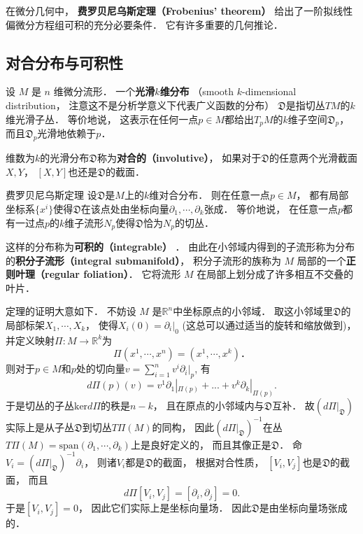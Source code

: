 

在微分几何中， \textbf{费罗贝尼乌斯定理（Frobenius' theorem）} 给出了一阶拟线性偏微分方程组可积的充分必要条件． 它有许多重要的几何推论．

\subsection{对合分布与可积性}
设 $M$ 是 $n$ 维微分流形． 一个\textbf{光滑$k$维分布} （smooth $k$-dimensional distribution， 注意这不是分析学意义下代表广义函数的分布） $\mathfrak{D}$是指切丛$TM$的$k$维光滑子丛． 等价地说， 这表示在任何一点$p\in M$都给出$T_pM$的$k$维子空间$\mathfrak{D}_p$， 而且$\mathfrak{D}_p$光滑地依赖于$p$．

维数为$k$的光滑分布$\mathfrak{D}$称为\textbf{对合的（involutive）}， 如果对于$\mathfrak{D}$的任意两个光滑截面$X,Y$， $[X,Y]$也还是$\mathfrak{D}$的截面． 

\begin{theorem}{费罗贝尼乌斯定理}
设$\mathfrak{D}$是$M$上的$k$维对合分布． 则在任意一点$p\in M$， 都有局部坐标系$\{x^i\}$使得$\mathfrak{D}$在该点处由坐标向量$\partial_1,\cdots ,\partial_k$张成． 等价地说， 在任意一点$p$都有一过点$p$的$k$维子流形$N_p$使得$\mathfrak{D}$恰为$N_p$的切丛．
\end{theorem}
这样的分布称为\textbf{可积的（integrable）} ． 由此在小邻域内得到的子流形称为分布的\textbf{积分子流形（integral submanifold）}， 积分子流形的族称为 $M$ 局部的一个\textbf{正则叶理（regular foliation）}． 它将流形 $M$ 在局部上划分成了许多相互不交叠的叶片．

定理的证明大意如下． 不妨设 $M$ 是$\mathbb{R}^n$中坐标原点的小邻域． 取这小邻域里$\mathfrak{D}$的局部标架$X_1,\cdots ,X_k$， 使得$X_i(0)=\partial_i|_0$ (这总可以通过适当的旋转和缩放做到)， 并定义映射$\Pi: M\to \mathbb{R}^k$为
$$
\Pi(x^1,\cdots ,x^n)=(x^1,\cdots ,x^k)．
$$
则对于$p\in M$和$p$处的切向量$v=\sum_{i=1}^nv^i\partial_i|_p$, 有
$$
d\Pi(p)(v)=v^1\partial_1|_{\Pi(p)}+...+v^k\partial_k|_{\Pi(p)}.
$$
于是切丛的子丛$\text{ker}d\Pi$的秩是$n-k$， 且在原点的小邻域内与$\mathfrak{D}$互补． 故$(d\Pi|_{\mathfrak{D}})$实际上是从子丛$\mathfrak{D}$到切丛$T\Pi(M)$的同构， 因此$(d\Pi|_{\mathfrak{D}})^{-1}$在丛$T\Pi(M)=\text{span}(\partial_1,\cdots ,\partial_k)$上是良好定义的， 而且其像正是$\mathfrak{D}$． 命$V_i=(d\Pi|_{\mathfrak{D}})^{-1}\partial_i$， 则诸$V_i$都是$\mathfrak{D}$的截面， 根据对合性质， $[V_i,V_j]$也是$\mathfrak{D}$的截面， 而且
$$
d\Pi[V_i,V_j]=[\partial_i,\partial_j]=0.
$$
于是$[V_i,V_j]=0$， 因此它们实际上是坐标向量场． 因此$\mathfrak{D}$是由坐标向量场张成的．

